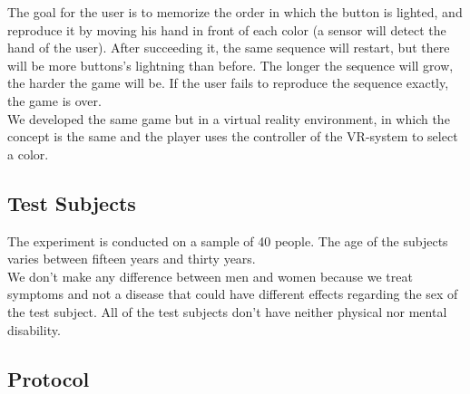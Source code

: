 \documentclass[12pt, openany, twocolumn]{article}
\begin{document}
    The goal for the user is to memorize the order in which the button is lighted, and reproduce it by moving his hand in front of each color (a sensor will detect the hand of the user).
    After succeeding it, the same sequence will restart, but there will be more buttons's lightning than before.
    The longer the sequence will grow, the harder the game will be.
    If the user fails to reproduce the sequence exactly, the game is over.
    \\

    We developed the same game but in a virtual reality environment, in which the concept is the same and the player uses the controller of the VR-system to select a color.
    \\

    \subsection{Test Subjects}
    The experiment is conducted on a sample of 40 people. The age of the subjects varies between fifteen years and thirty years. \\

    We don’t make any difference between men and women because we treat symptoms and not a disease that could have different effects regarding the sex of the test subject. All of the test subjects don’t have neither physical nor mental disability. \\
    
    \subsection{Protocol}
\end{document}
